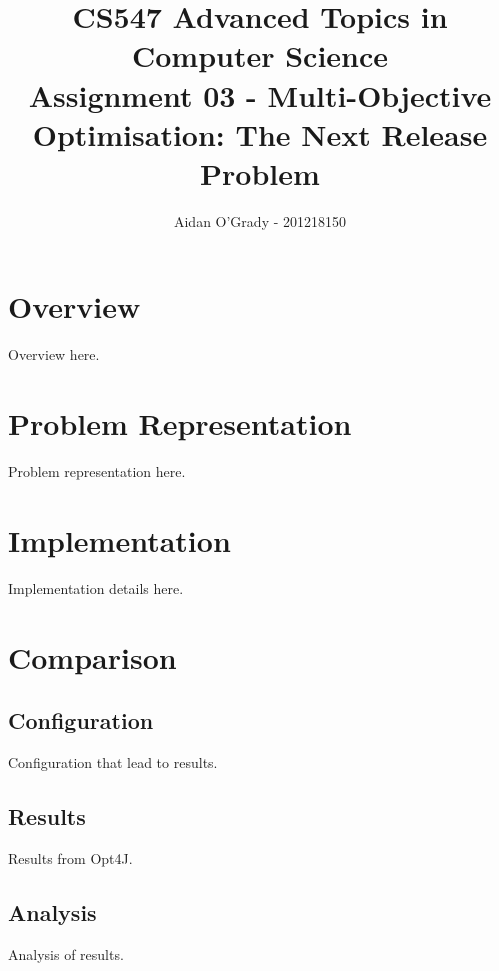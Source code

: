 \documentclass[11pt, a4paper]{article}
\begin{document}
\title{CS547 Advanced Topics in Computer Science\\
\large{Assignment 03 - Multi-Objective Optimisation: The Next Release Problem}}
\author{Aidan O'Grady - 201218150}
\date{}
\maketitle
\tableofcontents
\newpage

\section{Overview}
\label{sec:overview}
Overview here.

\section{Problem Representation}
\label{sec:problem_representation}
Problem representation here.

\section{Implementation}
\label{sec:implementation}
Implementation details here.


\section{Comparison}
\label{sec:comparison}

\subsection{Configuration} %
\label{sub:configuration}
Configuration that lead to results.

\subsection{Results} %
\label{sub:results}
Results from Opt4J.

\subsection{Analysis} %
\label{sub:analysis}
Analysis of results.

% 
%  
\end{document}
